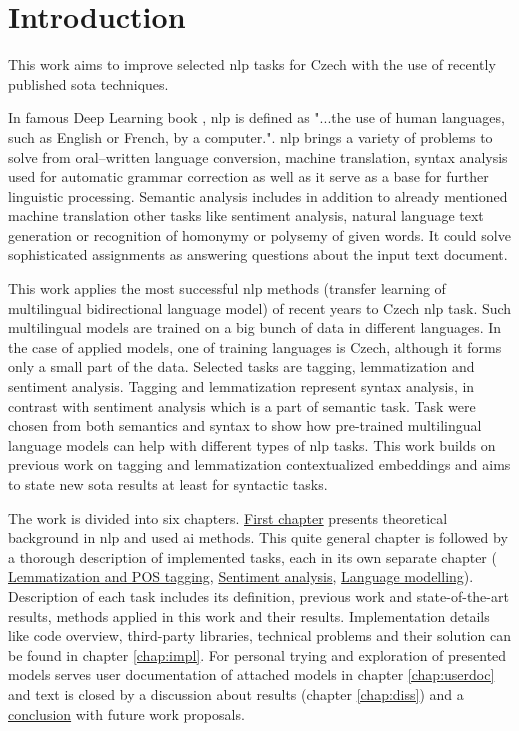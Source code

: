 \chapter*{Introduction}

This work aims to improve selected \gls{nlp} tasks for Czech with the use of recently published \gls{sota} techniques. 
 
In famous Deep Learning book \citep{Goodfellow-et-al-2016}, \gls{nlp} is defined as "...the use of human languages, such as English or French, by a computer.". \gls{nlp} brings a variety of problems to solve from oral--written language conversion, machine translation, syntax analysis used for automatic grammar correction as well as it serve as a base for further linguistic processing. Semantic analysis includes in addition to already mentioned machine translation other tasks like sentiment analysis, natural language text generation or recognition of homonymy or polysemy of given words. It could solve sophisticated assignments as answering questions about the input text document.
\par

This work applies the most successful \gls{nlp} methods (transfer learning of multilingual bidirectional language model) of recent years to Czech \gls{nlp} task. Such multilingual models are trained on a big bunch of data in different languages. In the case of applied models, one of training languages is Czech, although it forms only a small part of the data. %
Selected tasks are tagging, lemmatization and sentiment analysis. Tagging and lemmatization represent syntax analysis, in contrast with sentiment analysis which is a part of semantic task. %
Task were chosen from both semantics and syntax to show how pre-trained multilingual language models can help with different types of \gls{nlp} tasks. This work builds on previous work on tagging and lemmatization contextualized embeddings \citep{straka2019czech} and aims to state new \gls{sota} results at least for syntactic tasks.
\par
The work is divided into six chapters. \hyperref[chap:theandme]{First chapter} presents theoretical background in \gls{nlp} and used \gls{ai} methods. This quite general chapter is followed by a thorough description of implemented tasks, each in its own separate chapter ( \hyperref[chap:tag]{Lemmatization and POS tagging},  \hyperref[chap:sent]{Sentiment analysis},  \hyperref[chap:mod]{Language modelling}). Description of each task includes its definition, previous work and state-of-the-art results, methods applied in this work and their results. Implementation details like code overview, third-party libraries, technical problems and their solution can be found in chapter \ref{chap:impl}. 
For personal trying and exploration of presented models serves user documentation of attached models in chapter \ref{chap:userdoc} and text is closed by a discussion about results (chapter \ref{chap:diss}) and a \hyperref[chap:concl]{conclusion} with future work proposals.


